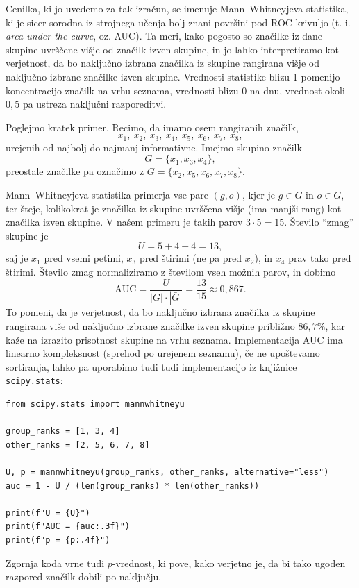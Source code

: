 Cenilka, ki jo uvedemo za tak izračun, 
%
%
se imenuje Mann--Whitneyjeva statistika, ki je sicer sorodna iz strojnega učenja bolj znani površini pod ROC krivuljo (t. i. {\em area under the curve}, oz. AUC). Ta meri, kako pogosto so značilke iz dane skupine uvrščene višje od značilk izven skupine, in jo lahko interpretiramo kot verjetnost, da bo naključno izbrana značilka iz skupine rangirana višje od naključno izbrane značilke izven skupine. Vrednosti statistike blizu 1 pomenijo koncentracijo značilk na vrhu seznama, vrednosti blizu 0 na dnu, vrednost okoli $0{,}5$ pa ustreza naključni razporeditvi.

Poglejmo kratek primer. Recimo, da imamo osem rangiranih značilk,
\[
x_1,\ x_2,\ x_3,\ x_4,\ x_5,\ x_6,\ x_7,\ x_8,
\]
urejenih od najbolj do najmanj informativne. Imejmo skupino značilk
\[
G=\{x_1, x_3, x_4\},
\]
preostale značilke pa označimo z $\bar G=\{x_2, x_5, x_6, x_7, x_8\}$.

Mann--Whitneyjeva statistika primerja vse pare $(g, o)$, kjer je $g \in G$ in $o \in \bar G$, ter šteje, kolikokrat je značilka iz skupine uvrščena višje (ima manjši rang) kot značilka izven skupine. V našem primeru je takih parov $3 \cdot 5 = 15$. Število ``zmag'' skupine je
\[
U = 5 + 4 + 4 = 13,
\]
saj je $x_1$ pred vsemi petimi, $x_3$ pred štirimi (ne pa pred $x_2$), in $x_4$ prav tako pred štirimi. Število zmag normaliziramo z številom vseh možnih parov, in dobimo
\[
\mathrm{AUC}=\frac{U}{|G|\cdot |\bar G|}=\frac{13}{15}\approx 0{,}867.
\]
To pomeni, da je verjetnost, da bo naključno izbrana značilka iz skupine rangirana više od naključno izbrane značilke izven skupine približno $86{,}7\%$, kar kaže na izrazito prisotnost skupine na vrhu seznama. Implementacija AUC ima linearno kompleksnost (sprehod po urejenem seznamu), če ne upoštevamo sortiranja, lahko pa uporabimo tudi tudi implementacijo iz knjižnice \texttt{scipy.stats}:

\begin{lstlisting}
from scipy.stats import mannwhitneyu

group_ranks = [1, 3, 4]
other_ranks = [2, 5, 6, 7, 8]

U, p = mannwhitneyu(group_ranks, other_ranks, alternative="less")
auc = 1 - U / (len(group_ranks) * len(other_ranks))

print(f"U = {U}")
print(f"AUC = {auc:.3f}")
print(f"p = {p:.4f}")
\end{lstlisting}
Zgornja koda vrne tudi $p$-vrednost, ki pove, kako verjetno je, da bi tako ugoden razpored značilk dobili po naključju.

